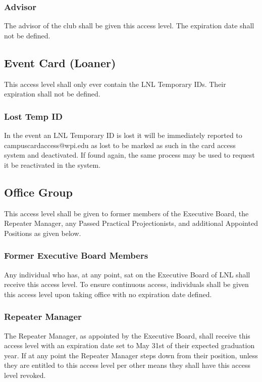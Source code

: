 \documentclass[12pt,letterpaper,oneside]{book}
\begin{document}
\subsubsection{Advisor}
The advisor of the club shall be given this access level. The expiration date shall not be defined.

\subsection{Event Card (Loaner)}
This access level shall only ever contain the LNL Temporary IDs. Their expiration shall not be defined.

\subsubsection{Lost Temp ID}
In the event an LNL Temporary ID is lost it will be immediately reported to campuscardaccess@wpi.edu as lost to be marked as such in the card access system and deactivated. If found again, the same process may be used to request it be reactivated in the system.

\subsection{Office Group}
This access level shall be given to former members of the Executive Board, the Repeater Manager, any Passed Practical Projectionists, and additional Appointed Positions as given below.

\subsubsection{Former Executive Board Members}
Any individual who has, at any point, sat on the Executive Board of LNL shall receive this access level. To ensure continuous access, individuals shall be given this access level upon taking office with no expiration date defined.

\subsubsection{Repeater Manager}
The Repeater Manager, as appointed by the Executive Board, shall receive this access level with an expiration date set to May 31st of their expected graduation year. If at any point the Repeater Manager steps down from their position, unless they are entitled to this access level per other means they shall have this access level revoked.
\end{document}
